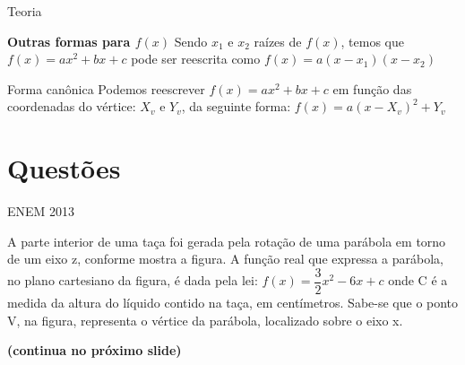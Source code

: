 \documentclass[11pt]{beamer}
\begin{document}
\begin{frame}{Teoria}

    \begin{block}{\textbf{Outras formas para $f(x)$}}
        Sendo $x_{1}$ e $x_{2}$ raízes de $f(x)$, temos que $f(x)=ax^{2}+bx+c$ pode ser reescrita como $f(x)=a(x-x_{1})(x-x_ {2})$
    \end{block}

    \pause 
    
    \begin{block}{Forma canônica}
        Podemos reescrever $f(x)=ax^{2}+bx+c$ em função das coordenadas do vértice: $X_{v}$ e $Y_{v}$, 
        da seguinte forma: $f(x)=a(x-X_{v})^{2}+Y_{v}$
    \end{block}
\end{frame}



\section{Questões}

\begin{frame}{ENEM 2013}
    
    A parte interior de uma taça foi gerada pela rotação de uma parábola em torno de um eixo z, conforme mostra a figura. A função real que expressa a parábola, no plano cartesiano da figura, é dada pela lei: $f(x)=\dfrac{3}{2}x^{2}-6x+c$ onde C é a medida da altura do líquido contido na taça, em centímetros. Sabe-se que o ponto V, na figura, representa o vértice da parábola, localizado sobre o eixo x. 

    \vfill
    \textbf{(continua no próximo slide)}
    
\end{frame}
\end{document}
